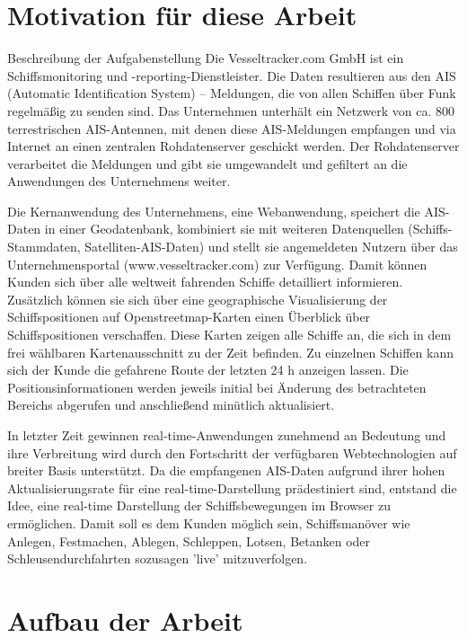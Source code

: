 \section{Motivation für diese Arbeit}\label{s.Motivation für diese Arbeit}
Beschreibung der Aufgabenstellung
Die Vesseltracker.com GmbH ist ein Schiffsmonitoring und -reporting-Dienstleister.  Die Daten resultieren aus den AIS (Automatic Identification System) – Meldungen, die von allen Schiffen über Funk regelmäßig zu senden sind. Das Unternehmen unterhält ein Netzwerk von ca. 800 terrestrischen AIS-Antennen, mit denen diese AIS-Meldungen empfangen und via Internet an einen zentralen Rohdatenserver geschickt werden. Der Rohdatenserver verarbeitet die Meldungen und gibt sie umgewandelt und gefiltert an die Anwendungen des Unternehmens weiter.

Die Kernanwendung des Unternehmens, eine Webanwendung, speichert die AIS-Daten in einer Geodatenbank, kombiniert sie mit weiteren Datenquellen (Schiffs-Stammdaten, Satelliten-AIS-Daten) und stellt sie angemeldeten Nutzern über das Unternehmensportal (www.vesseltracker.com) zur Verfügung. Damit können Kunden sich über alle weltweit fahrenden Schiffe detailliert informieren. Zusätzlich können sie sich über eine geographische Visualisierung der Schiffspositionen auf Openstreetmap-Karten einen Überblick über Schiffspositionen verschaffen. Diese Karten zeigen alle Schiffe an, die sich in dem frei wählbaren Kartenausschnitt zu der Zeit befinden. Zu einzelnen Schiffen kann sich der Kunde die gefahrene Route der letzten 24 h anzeigen lassen. Die Positionsinformationen werden jeweils initial bei Änderung des betrachteten Bereichs abgerufen und anschließend minütlich aktualisiert.

In letzter Zeit gewinnen real-time-Anwendungen zunehmend an Bedeutung und ihre Verbreitung wird durch den Fortschritt der verfügbaren Webtechnologien auf breiter Basis unterstützt. Da die empfangenen AIS-Daten aufgrund ihrer hohen Aktualisierungsrate für eine real-time-Darstellung prädestiniert sind, entstand die Idee, eine real-time Darstellung der Schiffsbewegungen im Browser zu ermöglichen. Damit soll es dem Kunden möglich sein, Schiffsmanöver wie Anlegen, Festmachen, Ablegen, Schleppen, Lotsen, Betanken oder Schleusendurchfahrten sozusagen 'live' mitzuverfolgen.

\section{Aufbau der Arbeit}\label{s.Aufbau der Arbeit}



